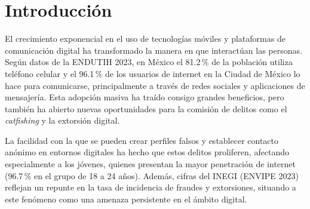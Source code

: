 \documentclass{article}
\begin{document}
\clearpage %
\thispagestyle{empty}%
\tableofcontents\newpage

\section{\label{ref-001}Introducción}







El crecimiento exponencial en el uso de tecnologías móviles y plataformas de comunicación digital ha transformado la manera en que interactúan las personas. Según datos de la ENDUTIH 2023, en México el 81.2\,\% de la población utiliza teléfono celular y el 96.1\,\% de los usuarios de internet en la Ciudad de México lo hace para comunicarse, principalmente a través de redes sociales y aplicaciones de mensajería. Esta adopción masiva ha traído consigo grandes beneficios, pero también ha abierto nuevas oportunidades para la comisión de delitos como el \textit{catfishing} y la extorsión digital.

La facilidad con la que se pueden crear perfiles falsos y establecer contacto anónimo en entornos digitales ha hecho que estos delitos proliferen, afectando especialmente a los jóvenes, quienes presentan la mayor penetración de internet (96.7\,\% en el grupo de 18 a 24 años). Además, cifras del INEGI (ENVIPE 2023) reflejan un repunte en la tasa de incidencia de fraudes y extorsiones, situando a este fenómeno como una amenaza persistente en el ámbito digital.
\end{document}
